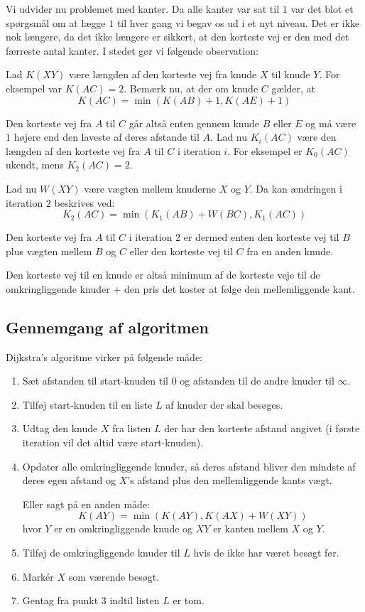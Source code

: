 \documentclass[10pt,a4paper,danish]{article}
\begin{document}
Vi udvider nu problemet med kanter. Da alle kanter var sat til $1$ var
det blot et spørgsmål om at lægge $1$ til hver gang vi begav os ud i
et nyt niveau. Det er ikke nok længere, da det ikke længere er
sikkert, at den korteste vej er den med det færreste antal kanter. I
stedet gør vi følgende observation:

Lad $K(XY)$ være længden af den korteste vej fra knude $X$ til knude
$Y$. For eksempel var $K(AC)=2$. Bemærk nu, at der om knude $C$
gælder, at
\[K(AC) = \min(K(AB)+1,K(AE)+1) \]

Den korteste vej fra $A$ til $C$ går altså enten gennem knude $B$
eller $E$ og må være $1$ højere end den laveste af deres afstande til
$A$.
Lad nu $K_i(AC)$ være den længden af den korteste vej fra $A$ til $C$
i iteration $i$. For eksempel er $K_0(AC)$ ukendt, mens $K_2(AC)=2$.

Lad nu $W(XY)$ være vægten mellem knuderne $X$ og $Y$. Da kan
ændringen i iteration $2$ beskrives ved:
\[ K_2(AC) = \min(K_1(AB) + W(BC), K_1(AC)) \]

Den korteste vej fra $A$ til $C$ i iteration $2$ er dermed enten den
korteste vej til $B$ plus vægten mellem $B$ og $C$ eller den korteste
vej til $C$ fra en anden knude.

Den korteste vej til en knude er altså minimum af de korteste veje til
de omkringliggende knuder + den pris det koster at følge den
mellemliggende kant.

\subsection{Gennemgang af algoritmen}
Dijkstra's algoritme virker på følgende måde:
\begin{enumerate}
\item Sæt afstanden til start-knuden til $0$ og afstanden til de andre
  knuder til $\infty$.
\item Tilføj start-knuden til en liste $L$ af knuder der skal besøges.
\item Udtag den knude $X$ fra listen $L$ der har den korteste afstand
  angivet (i første iteration vil det altid være start-knuden).
\item Opdater alle omkringliggende knuder, så deres afstand bliver den
  mindste af deres egen afstand og $X$'s afstand plus den
  mellemliggende kants vægt.

  Eller sagt på en anden måde:
  \[ K(AY) = \min(K(AY), K(AX)+W(XY)) \]
  hvor $Y$ er en omkringliggende knude og $XY$ er kanten mellem $X$ og
  $Y$.
\item Tilføj de omkringliggende knuder til $L$ hvis de ikke har været
  besøgt før.
\item Mark\'er $X$ som værende besøgt.
\item Gentag fra punkt 3 indtil listen $L$ er tom.
\end{enumerate}
\end{document}
